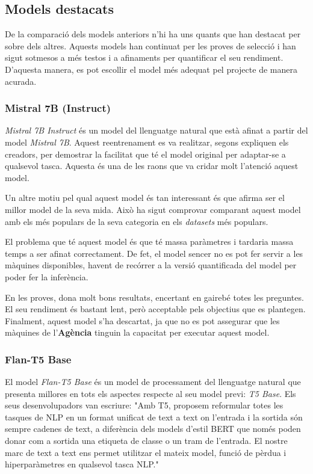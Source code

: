 \subsection{Models destacats}
De la comparació dels models anteriors n'hi ha uns quants que han destacat per sobre dels altres. Aquests models han continuat per les proves de selecció i han sigut sotmesos a més testos i a afinaments per quantificar el seu rendiment. D'aquesta manera, es pot escollir el model més adequat pel projecte de manera acurada.

\subsubsection{Mistral 7B (Instruct)}
\textit{Mistral 7B Instruct} \cite{mistral} és un model del llenguatge natural que està afinat a partir del model \textit{Mistral 7B}. Aquest reentrenament es va realitzar, segons expliquen els creadors, per demostrar la facilitat que té el model original per adaptar-se a qualsevol tasca. Aquesta és una de les raons que va cridar molt l'atenció aquest model.

Un altre motiu pel qual aquest model és tan interessant és que afirma ser el millor model de la seva mida. Això ha sigut comprovar comparant aquest model amb els més populars de la seva categoria en els \textit{datasets} més populars.

El problema que té aquest model és que té massa paràmetres i tardaria massa temps a ser afinat correctament. De fet, el model sencer no es pot fer servir a les màquines disponibles, havent de recórrer a la versió quantificada del model per poder fer la inferència.

En les proves, dona molt bons resultats, encertant en gairebé totes les preguntes. El seu rendiment és bastant lent, però acceptable pels objectius que es plantegen. Finalment, aquest model s'ha descartat, ja que no es pot assegurar que les màquines de l'\textbf{Agència} tinguin la capacitat per executar aquest model.

\subsubsection{Flan-T5 Base}
El model \textit{Flan-T5 Base} \cite{flan-t5} és un model de processament del llenguatge natural que presenta millores en tots els aspectes respecte al seu model previ: \textit{T5 Base}. Els seus desenvolupadors van escriure: "Amb T5, proposem reformular totes les tasques de NLP en un format unificat de text a text on l'entrada i la sortida són sempre cadenes de text, a diferència dels models d'estil BERT que només poden donar com a sortida una etiqueta de classe o un tram de l'entrada. El nostre marc de text a text ens permet utilitzar el mateix model, funció de pèrdua i hiperparàmetres en qualsevol tasca NLP."

